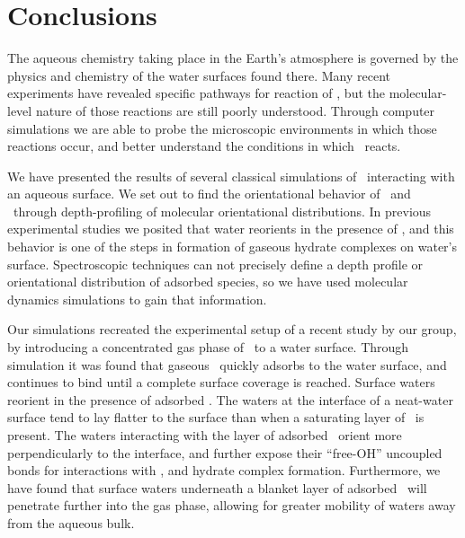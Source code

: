\section {Conclusions}

The aqueous chemistry taking place in the Earth's atmosphere is governed by the physics and chemistry of the water surfaces found there. Many recent experiments have revealed specific pathways for reaction of \suldiox, but the molecular-level nature of those reactions are still poorly understood. Through computer simulations we are able to probe the microscopic environments in which those reactions occur, and better understand the conditions in which \suldiox~reacts.

We have presented the results of several classical simulations of \suldiox~interacting with an aqueous surface. We set out to find the orientational behavior of \wat~and \suldiox~through depth-profiling of molecular orientational distributions. In previous experimental studies we posited that water reorients in the presence of \suldiox, and this behavior is one of the steps in formation of gaseous hydrate complexes on water's surface. Spectroscopic techniques can not precisely define a depth profile or orientational distribution of adsorbed species, so we have used molecular dynamics simulations to gain that information.

Our simulations recreated the experimental setup of a recent study by our group,\cite{Ota2011} by introducing a concentrated gas phase of \suldiox~to a water surface. Through simulation it was found that gaseous \suldiox~quickly adsorbs to the water surface, and continues to bind until a complete surface coverage is reached. Surface waters reorient in the presence of adsorbed \suldiox. The waters at the interface of a neat-water surface tend to lay flatter to the surface than when a saturating layer of \suldiox~is present. The waters interacting with the layer of adsorbed \suldiox~orient more perpendicularly to the interface, and further expose their ``free-OH'' uncoupled bonds for interactions with \suldiox, and hydrate complex formation. Furthermore, we have found that surface waters underneath a blanket layer of adsorbed \suldiox~will penetrate further into the gas phase, allowing for greater mobility of waters away from the aqueous bulk.

